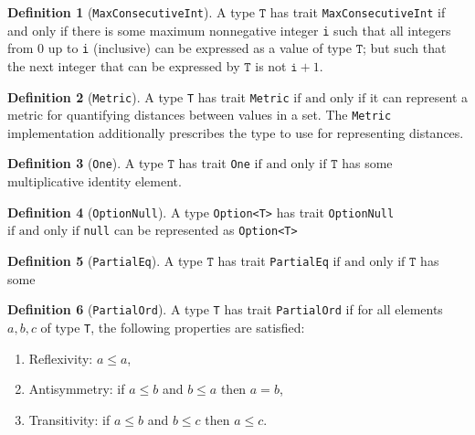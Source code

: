 \documentclass[11pt,a4paper]{article}
\theoremstyle{definition}
\newtheorem{definition}{Definition}[section]
\newcommand{\grace}[1]{{ {\color{purple}{(grace)~#1}}}}
\newcommand{\T}{\texttt{T}}
\newcommand{\iffText}{\text{if and only if}}
\begin{document}
\begin{definition}[\texttt{MaxConsecutiveInt}]
A type $\T$ has trait \texttt{MaxConsecutiveInt} if and only if there is some maximum nonnegative integer \texttt{i} such that all integers from 0 up to \texttt{i} (inclusive) can be expressed as a value of type $\T$; but such that the next integer that can be expressed by $\T$ is not $\texttt{i}+1$.
\end{definition}

\begin{definition}[\texttt{Metric}]
A type \texttt{T} has trait \texttt{Metric} $\iffText$ it can represent a metric for quantifying distances between values in a set. The \texttt{Metric} implementation additionally prescribes the type to use for representing distances.
\end{definition}

\begin{definition}[\texttt{One}]
    A type $\T$ has trait \texttt{One} $\iffText$ $\T$ has some multiplicative identity element.
\end{definition}

\begin{definition}[\texttt{OptionNull}]
A type \texttt{Option<T>} has trait \texttt{OptionNull} $\iffText$ \texttt{null} can be represented as \texttt{Option<T>} \grace{Check this because not sure if it makes sense.}
\end{definition}


\begin{definition}[\texttt{PartialEq}]
    A type $\T$ has trait \texttt{PartialEq} $\iffText$ $\T$ has some \grace{TODO}
\end{definition}

\begin{definition}[\texttt{PartialOrd}]\label{def:partial}
A type \texttt{T} has trait \texttt{PartialOrd} if for all elements $a, b, c$ of type \texttt{T}, the following properties are satisfied:

    \begin{enumerate}
        \item Reflexivity: $a \leq a$,
        \item Antisymmetry: if $a \leq b$ and $b \leq a$ then $a=b$,
        \item Transitivity: if $a \leq b$ and $b \leq c$ then $a \leq c$.
    \end{enumerate}
\end{definition}
\end{document}

